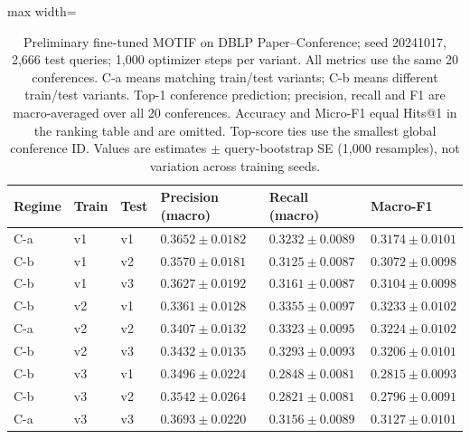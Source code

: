 \begin{table}[htbp]
\centering
\small
\renewcommand{\arraystretch}{1.15}
\setlength{\tabcolsep}{5pt}
\begin{adjustbox}{max width=\linewidth}
\begin{tabular}{|l|l|l|l|l|l|}
\hline
\textbf{Regime} & \textbf{Train} & \textbf{Test} & \textbf{Precision (macro)} & \textbf{Recall (macro)} & \textbf{Macro-F1} \\
\hline
C-a & v1 & v1 & $0.3652 \pm 0.0182$ & $0.3232 \pm 0.0089$ & $0.3174 \pm 0.0101$ \\
\hline
C-b & v1 & v2 & $0.3570 \pm 0.0181$ & $0.3125 \pm 0.0087$ & $0.3072 \pm 0.0098$ \\
\hline
C-b & v1 & v3 & $0.3627 \pm 0.0192$ & $0.3161 \pm 0.0087$ & $0.3104 \pm 0.0098$ \\
\hline
C-b & v2 & v1 & $0.3361 \pm 0.0128$ & $0.3355 \pm 0.0097$ & $0.3233 \pm 0.0102$ \\
\hline
C-a & v2 & v2 & $0.3407 \pm 0.0132$ & $0.3323 \pm 0.0095$ & $0.3224 \pm 0.0102$ \\
\hline
C-b & v2 & v3 & $0.3432 \pm 0.0135$ & $0.3293 \pm 0.0093$ & $0.3206 \pm 0.0101$ \\
\hline
C-b & v3 & v1 & $0.3496 \pm 0.0224$ & $0.2848 \pm 0.0081$ & $0.2815 \pm 0.0093$ \\
\hline
C-b & v3 & v2 & $0.3542 \pm 0.0264$ & $0.2821 \pm 0.0081$ & $0.2796 \pm 0.0091$ \\
\hline
C-a & v3 & v3 & $0.3693 \pm 0.0220$ & $0.3156 \pm 0.0089$ & $0.3127 \pm 0.0101$ \\
\hline
\end{tabular}
\end{adjustbox}
\caption{Preliminary fine-tuned MOTIF on DBLP Paper--Conference; seed 20241017, 2,666 test queries; 1,000 optimizer steps per variant. All metrics use the same 20 conferences. C-a means matching train/test variants; C-b means different train/test variants. Top-1 conference prediction; precision, recall and F1 are macro-averaged over all 20 conferences. Accuracy and Micro-F1 equal Hits@1 in the ranking table and are omitted. Top-score ties use the smallest global conference ID. Values are estimates $\pm$ query-bootstrap SE (1,000 resamples), not variation across training seeds.}
\label{tab:motif-dblp-matrix-conference-prediction}
\end{table}
